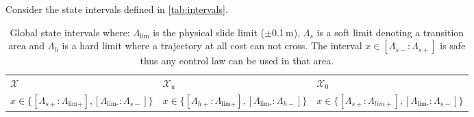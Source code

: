 Consider the state intervals defined in \autoref{tab:intervals}.
\begin{table}[H]
	\begin{tabularx}{\textwidth}{X X X }
\rowcolor{HeaderBlue} 
$\mathcal{X}$ & $\mathcal{X}_u$  & $\mathcal{X}_0$ \\
$x \in \{[\Lambda_{s+}:\Lambda_\text{lim+}],[\Lambda_\text{lim-}:\Lambda_{s-}]\}$  & $x \in \{[\Lambda_{h+}:\Lambda_\text{lim+}],[\Lambda_\text{lim-}:\Lambda_{h-}]\} $ & $x \in \{[\Lambda_{s+}:\Lambda_{lim+}],[\Lambda_\text{lim-}:\Lambda_{s-}]\}$  \\
\end{tabularx}
\caption{Global state intervals where: $\Lambda_\text{lim}$ is the physical slide limit ($\pm$0.1\,m), $\Lambda_s$ is a soft limit denoting a transition area and $\Lambda_h$ is a hard limit where a trajectory at all cost can not cross. The interval $x \in [\Lambda_{s-}:\Lambda_{s+}]$ is safe thus any control law can be used in that area.}
\label{tab:intervals}
\end{table}
